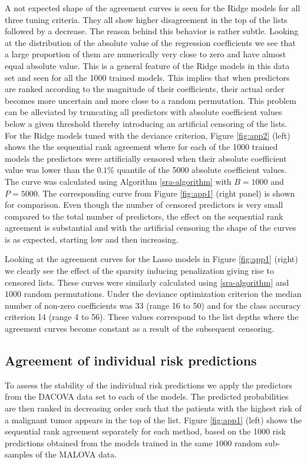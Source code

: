 \documentclass[12pt,a4paper]{article}
\theoremstyle{plain}
\begin{document}
A not expected shape of the agreement curves is seen for the Ridge
models for all three tuning criteria. They all show higher
disagreement in the top of the lists followed by a decrease. The
reason behind this behavior is rather subtle. Looking at the
distribution of the absolute value of the regression coefficients we see that a large
proportion of them are numerically very close to zero and have almost
equal absolute value. This is a general feature of the Ridge models in
this data set and seen for all the 1000 trained models.
This implies that when predictors are ranked according to the
magnitude of their coefficients, their actual order becomes more
uncertain and more close to a random permutation. This problem can be
alleviated by truncating all predictors with absolute coefficient values
below a given threshold thereby introducing an artificial censoring of the lists.
For the Ridge models tuned with the deviance criterion, Figure \ref{fig:app2} (left) shows the
the sequential rank agreement where for each of the 1000 trained
models the predictors were artificially censored when their absolute
coefficient value was lower than the $0.1\%$ quantile of the 5000
absolute coefficient values. The curve was calculated
using Algorithm \ref{sra-algorithm} with $B=1000$ and $P=5000$. The corresponding
curve from Figure \ref{fig:app1} (right panel) is shown for comparison.
Even though the number of censored predictors is very small compared to the total
number of predictors, the effect on the sequential rank agreement is
substantial and with the artificial censoring the shape of the curves
is as expected, starting low and then increasing.

Looking at the agreement curves for the Lasso models in Figure \ref{fig:app1}
(right) we clearly see the effect of the sparsity inducing penalization giving
rise to censored lists. These curves were similarly calculated using \ref{sra-algorithm}
and $1000$ random permutations. Under the deviance optimization criterion the
median number of non-zero coefficients was 33 (range 16 to 50) and for the
class accuracy criterion 14 (range 4 to 56). These values correspond to
the list depths where the agreement curves become constant as a result of
the subsequent censoring.




\subsection{Agreement of individual risk predictions}
\label{sec:airp}
To assess the stability of the individual risk predictions we apply
the predictors from the DACOVA data set to each of the models. The
predicted probabilities are then ranked in decreasing order such that the
patients with the highest risk of a malignant tumor appears in the top
of the list. Figure \ref{fig:app1} (left) shows the sequential rank
agreement separately for each method, based on the 1000 risk predictions
obtained from the models trained in the same $1000$ random sub-samples
of the MALOVA data.
\end{document}
